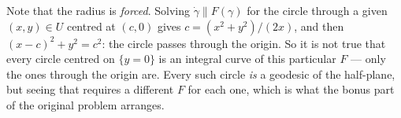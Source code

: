 \begin{exercisesolution}
\begin{enumerate}[label=\textbf{(\alph*)}]
    Note that the radius is \emph{forced}. Solving $\dot\gamma \parallel F(\gamma)$ for the circle
    through a given $(x,y) \in U$ centred at $(c,0)$ gives $c = (x^2+y^2)/(2x)$, and then $(x-c)^2 +
    y^2 = c^2$: the circle passes through the origin. So it is not true that every circle centred on
    $\{y=0\}$ is an integral curve of this particular $F$ --- only the ones through the origin are.
    Every such circle \emph{is} a geodesic of the half-plane, but seeing that requires a different
    $F$ for each one, which is what the bonus part of the original problem arranges.
\end{enumerate}
\end{exercisesolution}


